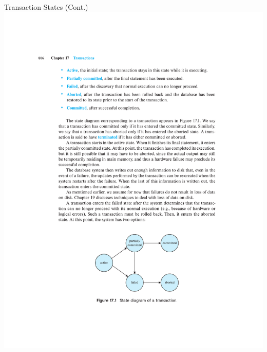 \documentclass{beamer}
\begin{document}
\begin{frame}{Transaction States (Cont.)}
    \centering
    \includegraphics[width=\textwidth, trim={5cm 3cm 5cm 18cm}, clip]{figures/p835_stages.pdf}
\end{frame}
\end{document}
